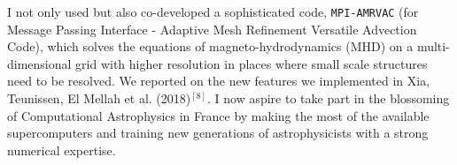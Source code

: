 \documentclass[11pt,onecolumn]{article}
\makeatletter
\newcommand{\grbs}{GRBs\xspace}
\newcommand{\mhd}{MHD\xspace}
\newcommand*{\ns}{NS\@\xspace}
\newcommand*{\bhs}{BHs\@\xspace}
\newcommand*{\eg}{e.g.\@\xspace}
\makeatother
\begin{document}
I not only used but also co-developed a sophisticated code, \texttt{MPI-AMRVAC} (for Message Passing Interface - Adaptive Mesh Refinement Versatile Advection Code), which solves the equations of magneto-hydrodynamics (\mhd) on a multi-dimensional grid with higher resolution in places where small scale structures need to be resolved. We reported on the new features we implemented in Xia, Teunissen, El Mellah et al. (2018)$^{\left[8\right]}$. I now aspire to take part in the blossoming of Computational Astrophysics in France by making the most of the available supercomputers and training new generations of astrophysicists with a strong numerical expertise.

%
%
%
\end{document}
